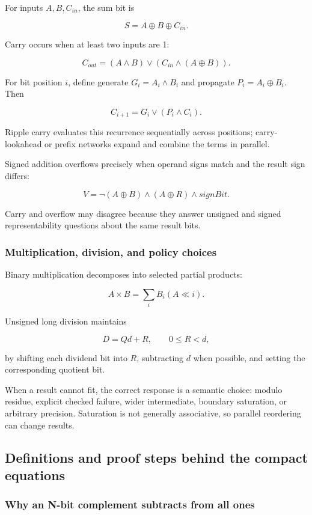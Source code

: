 For inputs \(A,B,C_{in}\), the sum bit is

\[
S=A\oplus B\oplus C_{in}.
\]

Carry occurs when at least two inputs are 1:

\[
C_{out}=(A\land B)\lor(C_{in}\land(A\oplus B)).
\]

For bit position \(i\), define generate \(G_i=A_i\land B_i\) and propagate \(P_i=A_i\oplus B_i\). Then

\[
C_{i+1}=G_i\lor(P_i\land C_i).
\]

Ripple carry evaluates this recurrence sequentially across positions; carry-lookahead or prefix networks expand and combine the terms in parallel.

Signed addition overflows precisely when operand signs match and the result sign differs:

\[
V=\neg(A\oplus B)\land(A\oplus R)\land signBit.
\]

Carry and overflow may disagree because they answer unsigned and signed representability questions about the same result bits.

\subsubsection{Multiplication, division, and policy choices}\label{multiplication-division-and-policy-choices}

Binary multiplication decomposes into selected partial products:

\[
A\times B=\sum_i B_i(A\ll i).
\]

Unsigned long division maintains

\[
D=Qd+R,\qquad 0\le R<d,
\]

by shifting each dividend bit into \(R\), subtracting \(d\) when possible, and setting the corresponding quotient bit.

When a result cannot fit, the correct response is a semantic choice: modulo residue, explicit checked failure, wider intermediate, boundary saturation, or arbitrary precision. Saturation is not generally associative, so parallel reordering can change results.

\subsection{Definitions and proof steps behind the compact equations}\label{definitions-and-proof-steps-behind-the-compact-equations}

\subsubsection{Why an N-bit complement subtracts from all ones}\label{why-an-n-bit-complement-subtracts-from-all-ones}

